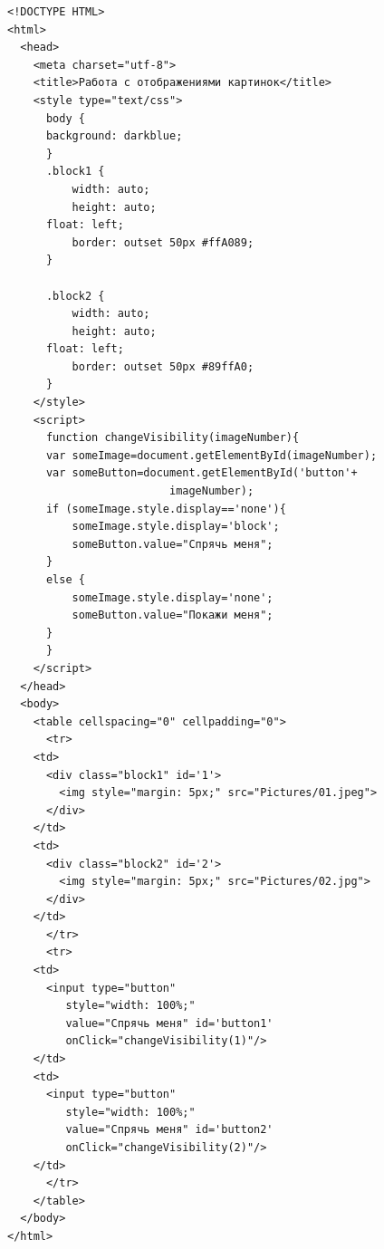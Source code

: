 \begin{verbatim}
<!DOCTYPE HTML>
<html>
  <head>
    <meta charset="utf-8">
    <title>Работа с отображениями картинок</title>
    <style type="text/css">
      body {
      background: darkblue;
      }
      .block1 {
          width: auto;
          height: auto;
	  float: left;
          border: outset 50px #ffA089;
      }
      
      .block2 {
          width: auto;
          height: auto;
	  float: left;
          border: outset 50px #89ffA0;
      }
    </style>
    <script>
      function changeVisibility(imageNumber){
	  var someImage=document.getElementById(imageNumber);
	  var someButton=document.getElementById('button'+
						 imageNumber);
	  if (someImage.style.display=='none'){
	      someImage.style.display='block';
	      someButton.value="Спрячь меня";
	  }
	  else {
	      someImage.style.display='none';
	      someButton.value="Покажи меня";
	  }
      }
    </script>
  </head>
  <body>
    <table cellspacing="0" cellpadding="0">
      <tr>
	<td>
	  <div class="block1" id='1'>
	    <img style="margin: 5px;" src="Pictures/01.jpeg">
	  </div>
	</td>
	<td>
	  <div class="block2" id='2'>
	    <img style="margin: 5px;" src="Pictures/02.jpg">
	  </div>
	</td>
      </tr>
      <tr>
	<td>
	  <input type="button"
		 style="width: 100%;"
		 value="Спрячь меня" id='button1'
		 onClick="changeVisibility(1)"/>
	</td>
	<td>
	  <input type="button"
		 style="width: 100%;"
		 value="Спрячь меня" id='button2'
		 onClick="changeVisibility(2)"/>
	</td>
      </tr>
    </table>
  </body>
</html>
\end{verbatim}
